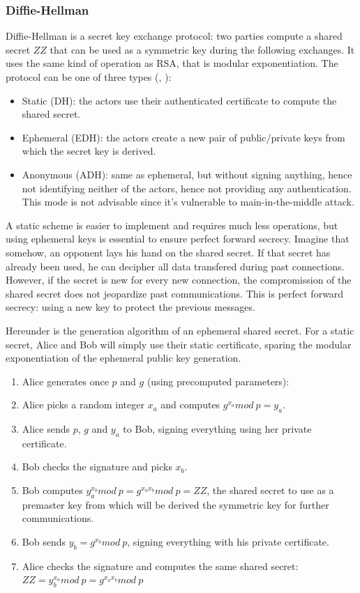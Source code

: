 \subsubsection{Diffie-Hellman}
Diffie-Hellman is a secret key exchange protocol: two parties compute a shared secret $ZZ$ that can be used as a symmetric key during the following exchanges.
It uses the same kind of operation as RSA, that is modular exponentiation.
The protocol can be one of three types (\cite{rfc2631}, \cite{Frankel:2005:SGI:2206289}):
\begin{itemize}
	\item Static (DH): the actors use their authenticated certificate to compute the shared secret.
	\item Ephemeral (EDH): the actors create a new pair of public/private keys from which the secret key is derived.
	\item Anonymous (ADH): same as ephemeral, but without signing anything, hence not identifying neither of the actors, hence not providing any authentication. This mode is not advisable since it's vulnerable to main-in-the-middle attack.
\end{itemize}
A static scheme is easier to implement and requires much less operations, but using ephemeral keys is essential to ensure perfect forward secrecy.
Imagine that somehow, an opponent lays his hand on the shared secret.
If that secret has already been used, he can decipher all data transfered during past connections.
However, if the secret is new for every new connection, the compromission of the shared secret does not jeopardize past communications.
This is perfect forward secrecy: using a new key to protect the previous messages.

Hereunder is the generation algorithm of an ephemeral shared secret.
For a static secret, Alice and Bob will simply use their static certificate, sparing the modular exponentiation of the ephemeral public key generation.
\begin{enumerate}
	\item Alice generates once $p$ and $g$ (using precomputed parameters):
	\begin{description}[nosep]
		\item[p] large prime number
		\item[g] a generator of $\mathds{Z}_p^*$
	\end{description}
	\item Alice picks a random integer $x_a$ and computes $g^{x_a} mod\ p = y_a$.
	\item Alice sends $p$, $g$ and $y_a$ to Bob, signing everything using her private certificate.
	\item Bob checks the signature and picks $x_b$.
	\item Bob computes $y_a^{x_b} mod\ p = g^{x_a x_b} mod\ p = ZZ$, the shared secret to use as a premaster key from which will be derived the symmetric key for further communications.
	\item Bob sends $y_b = g^{x_b} mod\ p$, signing everything with his private certificate.
	\item Alice checks the signature and computes the same shared secret: $ZZ = y_b^{x_a} mod\ p = g^{x_a x_b} mod\ p$
\end{enumerate}

